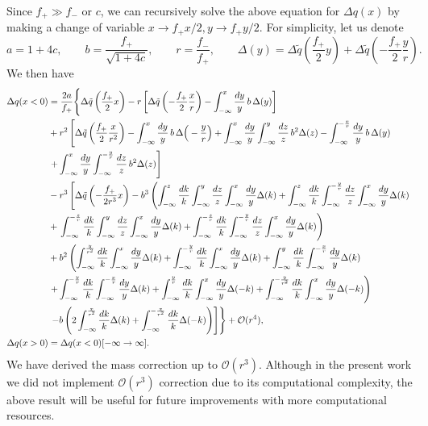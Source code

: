 Since $f_+\gg f_-$ or $c$, we can recursively solve the above equation for $\Delta q(x)$ by making a change of variable $x\to f_+ x/2, y\to f_+ y/2$. 
For simplicity, let us denote
%
\begin{equation}
a=1+4c, \hspace{2em} b=\frac{f_+}{\sqrt{1+4c}}, \hspace{2em} r=\frac{f_-}{f_+}, \hspace{2em} \Delta(y)=\Delta \tilde q\left(\frac{f_+}{2}y\right)+\Delta \tilde q\left(-\frac{f_+}{2}\frac{y}{r}\right).
\end{equation}
%
We then have
%
\begin{align}
\Delta q(x<0)&=\frac{2a}{f_{+}}\Bigg\{\Delta \tilde{q}\left( \frac{f_{+}}{2}%
x\right) -r\left[\Delta \tilde{q}\left( -\frac{f_{+}}{2}\frac{x}{r}\right)
-\int_{-\infty }^{x}\frac{dy}{y}\,b\,\Delta (y)\right]\non \\
& +r^{2}\left[\Delta \tilde{q}\left( \frac{f_{+}}{2}\frac{x}{r^{2}}\right)
-\int_{-\infty }^{x}\frac{dy}{y}\,b\,\Delta \Big(-\frac{y}{r}\Big)%
+\int_{-\infty }^{x}\frac{dy}{y}\int_{-\infty }^{y}\frac{dz}{z}\,b^{2}\Delta
(z)-\int_{-\infty }^{-\frac{x}{r}}\frac{dy}{y}\,b\,\Delta (y)\right.\non \\
& \left.+\int_{-\infty }^{x}\frac{dy}{y}\int_{-\infty }^{-\frac{y}{r}}\frac{dz}{z}%
\,b^{2}\Delta (z)\right]\\
& -r^3 \left[ \Delta \tilde{q}\left( -\frac{%
f_{+}}{2r^{3}}x\right) -b^{3}\left( \int_{-\infty }^{z}\frac{dk}{k}%
\int_{-\infty }^{y}\frac{dz}{z}\int_{-\infty }^{x}\frac{dy}{y}\Delta
(k)+\int_{-\infty }^{z}\frac{dk}{k}\int_{-\infty }^{-\frac{y}{r}}\frac{dz}{z}%
\int_{-\infty }^{x}\frac{dy}{y}\Delta (k)\right. \right.  \\
& +\left. \int_{-\infty }^{-\frac{z}{r}}\frac{dk}{k}\int_{-\infty }^{y}\frac{%
dz}{z}\int_{-\infty }^{x}\frac{dy}{y}\Delta (k)+\int_{-\infty }^{-\frac{z}{r}%
}\frac{dk}{k}\int_{-\infty }^{-\frac{y}{r}}\frac{dz}{z}\int_{-\infty }^{x}%
\frac{dy}{y}\Delta (k)\right)  \\
& +b^{2}\left( \int_{-\infty }^{\frac{y}{r^{2}}}\frac{dk}{k}\int_{-\infty
}^{x}\frac{dy}{y}\Delta (k)+\int_{-\infty }^{-\frac{y}{r}}\frac{dk}{k}%
\int_{-\infty }^{x}\frac{dy}{y}\Delta (k)+\int_{-\infty }^{y}\frac{dk}{k}%
\int_{-\infty }^{-\frac{x}{r}}\frac{dy}{y}\Delta (k)\right.  \\
& \left. +\int_{-\infty }^{-\frac{y}{r}}\frac{dk}{k}\int_{-\infty }^{-\frac{x%
}{r}}\frac{dy}{y}\Delta (k)+\int_{-\infty }^{\frac{y}{r}}\frac{dk}{k}%
\int_{-\infty }^{x}\frac{dy}{y}\Delta (-k)+\int_{-\infty }^{-\frac{y}{r^{2}}}%
\frac{dk}{k}\int_{-\infty }^{x}\frac{dy}{y}\Delta (-k)\right)  \\
& \left.\left. -b\left( 2\int_{-\infty }^{\frac{x}{r^{2}}}\frac{dk}{k}\Delta
(k)+\int_{-\infty }^{-\frac{x}{r^{2}}}\frac{dk}{k}\Delta (-k)\right) \right] \right\}
 +\mathcal{O}(r^{4}),\non\\
\Delta q(x>0)&=\Delta q(x<0)[-\infty\to\infty].
\end{align}
%
We have derived the mass correction up to $\mathcal O(r^3)$. Although in the present work we did not implement $\mathcal O(r^3)$ correction due to its computational complexity, the above result will be useful for future improvements with more computational resources.
